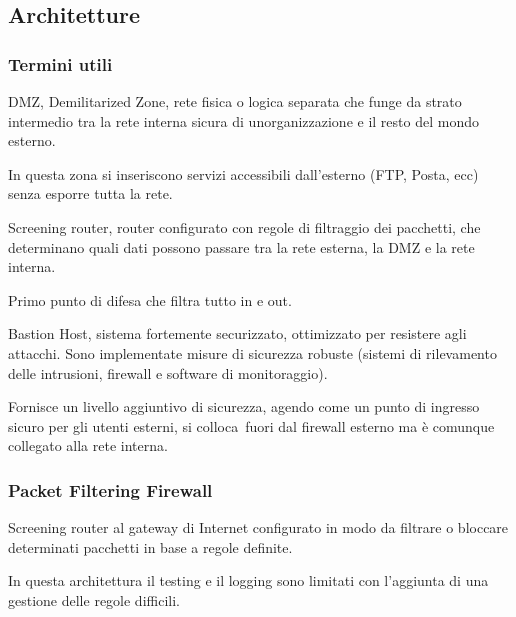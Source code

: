 \documentclass[
]{article}
\begin{document}
\subsection{\texorpdfstring{{Architetture}}{Architetture}}\label{h.4p4atul5jm93}

\subsubsection{\texorpdfstring{{Termini
utili}}{Termini utili}}\label{h.haatnhmh9541}

{DMZ}{, Demilitarized Zone, rete fisica o logica separata che funge da
strato intermedio tra la rete interna sicura di
un\textquotesingle organizzazione e il resto del mondo esterno.}

{}

{In questa zona si inseriscono servizi accessibili dall'esterno (FTP,
Posta, ecc) senza esporre tutta la rete.}

{}

{}

{Screening router}{, router configurato con regole di filtraggio dei
pacchetti, che determinano quali dati possono passare tra la rete
esterna, la DMZ e la rete interna.}

{}

{Primo punto di difesa che filtra tutto in e out.}

{}

{}

{Bastion Host}{, }{s}{istema fortemente securizzato, ottimizzato per
resistere agli attacchi. Sono implementate misure di sicurezza robuste
(sistemi di rilevamento delle intrusioni, firewall e software di
monitoraggio).}

{}

{Fornisce un livello aggiuntivo di sicurezza, agendo come un punto di
ingresso sicuro per gli utenti esterni, si }{colloca}{~fuori dal
firewall esterno ma è comunque collegato alla rete interna.}

\subsubsection{\texorpdfstring{{Packet Filtering
Firewall}}{Packet Filtering Firewall}}\label{h.xj2fkdw2ewt5}

{Screening router al gateway di Internet configurato in modo da filtrare
o bloccare determinati pacchetti in base a regole definite.}

{}

{In questa architettura il testing e il logging sono limitati con
l'aggiunta di una gestione delle regole difficili.}
\end{document}
